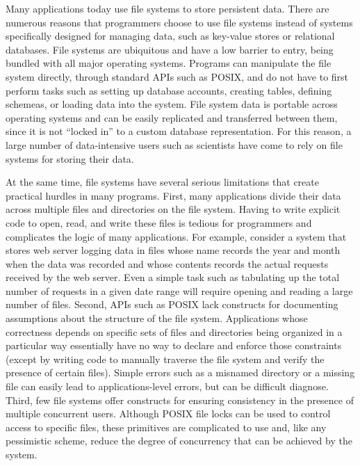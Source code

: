%
%
Many applications today use file systems to store persistent
data. There are numerous reasons that programmers choose to use file
systems instead of systems specifically designed for managing data,
such as key-value stores or relational databases. File systems are
ubiquitous and have a low barrier to entry, being bundled with all
major operating systems. Programs can manipulate the file system
directly, through standard APIs such as POSIX, and do not have to
first perform tasks such as setting up database accounts, creating
tables, defining schemeas, or loading data into the system. File
system data is portable across operating systems and can be easily
replicated and transferred between them, since it is not ``locked in''
to a custom database representation. For this reason, a large number
of data-intensive users such as scientists have come to rely on file
systems for storing their data.

%
%
At the same time, file systems have several serious limitations that
create practical hurdles in many programs. First, many applications
divide their data across multiple files and directories on the file
system. Having to write explicit code to open, read, and write these
files is tedious for programmers and complicates the logic of many
applications. For example, consider a system that stores web server
logging data in files whose name records the year and month when the
data was recorded and whose contents records the actual requests
received by the web server. Even a simple task such as tabulating up
the total number of requests in a given date range will require
opening and reading a large number of files. Second, APIs such as
POSIX lack constructs for documenting assumptions about the structure
of the file system. Applications whose correctness depends on specific
sets of files and directories being organized in a particular way
essentially have no way to declare and enforce those constraints
(except by writing code to manually traverse the file system and
verify the presence of certain files). Simple errors such as a
misnamed directory or a missing file can easily lead to
applications-level errors, but can be difficult diagnose. Third, few
file systems offer constructs for ensuring consistency in the presence
of multiple concurrent users. Although POSIX file locks can be used to
control access to specific files, these primitives are complicated to
use and, like any pessimistic scheme, reduce the degree of concurrency
that can be achieved by the system. 

